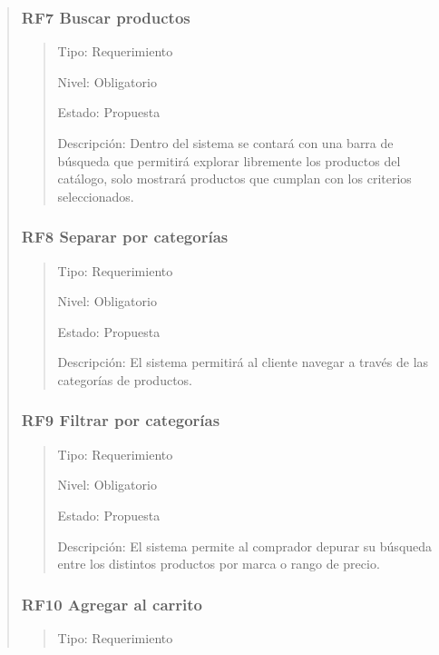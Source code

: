 \documentclass[14pt]{article}
\begin{document}
\begin{quote}
                \subsubsection{RF7 Buscar  productos}\label{RF7 Buscar  productos}
                    \begin{quote}
                        Tipo: Requerimiento
    
                        Nivel: Obligatorio
    
                        Estado: Propuesta
    
                        Descripción: Dentro del sistema se contará con una barra de búsqueda que permitirá explorar libremente los productos del catálogo, solo mostrará productos que cumplan con los criterios seleccionados.
                    \end{quote}
                \subsubsection{RF8 Separar por categorías}\label{RF8 Separar por categorías}
                    \begin{quote}
                        Tipo: Requerimiento
                        
                        Nivel: Obligatorio
                        
                        Estado: Propuesta
                        
                        Descripción: El sistema permitirá al cliente navegar a través de las categorías de productos.
                    \end{quote}
                \subsubsection{RF9 Filtrar por categorías}\label{RF9 Filtrar por categorías}
                    \begin{quote}
                        Tipo: Requerimiento
                        
                        Nivel: Obligatorio
                        
                        Estado: Propuesta
                        
                        Descripción: El sistema permite al comprador depurar su búsqueda entre los distintos productos por marca o rango de precio.
                    \end{quote}
                \subsubsection{RF10 Agregar al carrito}\label{RF10 Agregar al carrito}
                    \begin{quote}
                        Tipo: Requerimiento
                        

\end{quote}
\end{quote}
\end{document}

